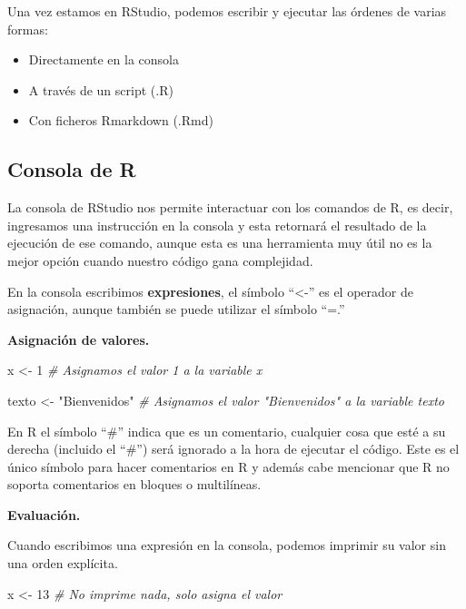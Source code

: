 \documentclass[
  12pt,
]{book}
\newenvironment{Shaded}{\begin{snugshade}}{\end{snugshade}}
\newcommand{\CommentTok}[1]{\textcolor[rgb]{0.56,0.35,0.01}{\textit{#1}}}
\newcommand{\DecValTok}[1]{\textcolor[rgb]{0.00,0.00,0.81}{#1}}
\newcommand{\NormalTok}[1]{#1}
\newcommand{\OtherTok}[1]{\textcolor[rgb]{0.56,0.35,0.01}{#1}}
\newcommand{\StringTok}[1]{\textcolor[rgb]{0.31,0.60,0.02}{#1}}
\providecommand{\tightlist}{%
  \setlength{\itemsep}{0pt}\setlength{\parskip}{0pt}}
\begin{document}
Una vez estamos en RStudio, podemos escribir y ejecutar las órdenes de varias formas:

\begin{itemize}
\tightlist
\item
  Directamente en la consola
\item
  A través de un script (.R)
\item
  Con ficheros Rmarkdown (.Rmd)
\end{itemize}

\hypertarget{consola-de-r}{%
\subsection{\texorpdfstring{\textbf{Consola de R}}{Consola de R}}\label{consola-de-r}}

La consola de RStudio nos permite interactuar con los comandos de R, es decir, ingresamos una instrucción en la consola y esta retornará el resultado de la ejecución de ese comando, aunque esta es una herramienta muy útil no es la mejor opción cuando nuestro código gana complejidad.

En la consola escribimos \textbf{expresiones}, el símbolo ``\textless-'' es el operador de asignación, aunque también se puede utilizar el símbolo ``=.''

\textbf{Asignación de valores.}

\begin{Shaded}
\begin{Highlighting}[]
\NormalTok{x }\OtherTok{\textless{}{-}} \DecValTok{1}  \CommentTok{\# Asignamos el valor 1 a la variable x}

\NormalTok{texto }\OtherTok{\textless{}{-}} \StringTok{"Bienvenidos"}  \CommentTok{\# Asignamos el valor "Bienvenidos" a la variable texto}
\end{Highlighting}
\end{Shaded}

En R el símbolo ``\#'' indica que es un comentario, cualquier cosa que esté a su derecha (incluido el ``\#'') será ignorado a la hora de ejecutar el código. Este es el único símbolo para hacer comentarios en R y además cabe mencionar que R no soporta comentarios en bloques o multilíneas.

\textbf{Evaluación.}

Cuando escribimos una expresión en la consola, podemos imprimir su valor sin una orden explícita.

\begin{Shaded}
\begin{Highlighting}[]
\NormalTok{x }\OtherTok{\textless{}{-}} \DecValTok{13} \CommentTok{\# No imprime nada, solo asigna el valor}
\end{Highlighting}
\end{Shaded}
\end{document}
